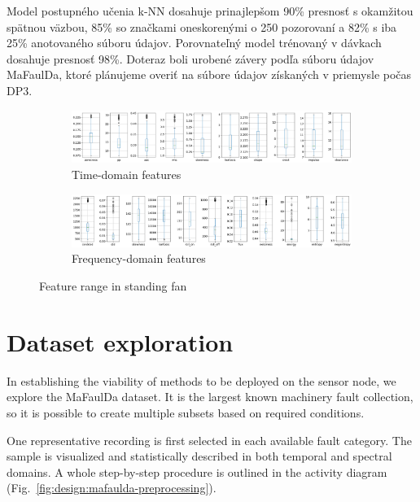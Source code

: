 Model postupného učenia k-NN dosahuje prinajlepšom 90\% presnosť s okamžitou spätnou väzbou, 85\% so značkami oneskorenými o 250 pozorovaní a 82\% s iba 25\% anotovaného súboru údajov. Porovnateľný model trénovaný v dávkach dosahuje presnosť 98\%.  Doteraz boli urobené závery podľa súboru údajov MaFaulDa, ktoré plánujeme overiť na súbore údajov získaných v priemysle počas DP3.




\begin{figure}[h]
    \centering
    \begin{subfigure}[b]{0.48\textwidth}
        \includegraphics[width=\textwidth]{assets/results/feature-values/fan-TD-features.png}
        \caption{Time-domain features}
    \end{subfigure}
    \hfill
    \begin{subfigure}[b]{0.48\textwidth}
        \includegraphics[width=\textwidth]{assets/results/feature-values/fan-FD-features.png}
        \caption{Frequency-domain features}
    \end{subfigure}
    \caption{Feature range in standing fan}
\end{figure}




\section{Dataset exploration}
In establishing the viability of methods to be deployed on the sensor node, we explore the MaFaulDa dataset. It is the largest known machinery fault collection, so it is possible to create multiple subsets based on required conditions. 

One representative recording is first selected in each available fault category. The sample is visualized and statistically described in both temporal and spectral domains. A whole step-by-step procedure is outlined in the activity diagram (Fig.~\ref{fig:design:mafaulda-preprocessing}).

